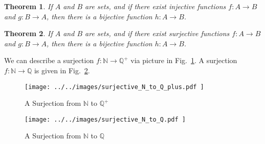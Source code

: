\documentclass{article}
\theoremstyle{plain}
\newtheorem{theorem}{Theorem}[section]
\theoremstyle{normal}
\begin{document}
        \begin{theorem}
            If $A$ and $B$ are sets, and if there exist injective functions
            $f:A\rightarrow{B}$ and $g:B\rightarrow{A}$, then there is a
            bijective function $h:A\rightarrow{B}$.
        \end{theorem}
        \begin{theorem}
            If $A$ and $B$ are sets, and if there exist surjective functions
            $f:A\rightarrow{B}$ and $g:B\rightarrow{A}$, then there is a
            bijective function $h:A\rightarrow{B}$.
        \end{theorem}
        We can describe a surjection $f:\mathbb{N}\rightarrow\mathbb{Q}^{+}$
        via picture in Fig.~\ref{fig:surjective_N_to_Q_plus}. A surjection
        $f:\mathbb{N}\rightarrow\mathbb{Q}$ is given in
        Fig.~\ref{fig:surjective_N_to_Q}.
        \begin{figure}
            \centering
            \texttt{[image: ../../images/surjective\_N\_to\_Q\_plus.pdf ]}
            \caption{A Surjection from $\mathbb{N}$ to $\mathbb{Q}^{+}$}
            \label{fig:surjective_N_to_Q_plus}
        \end{figure}
        \begin{figure}
            \centering
            \texttt{[image: ../../images/surjective\_N\_to\_Q.pdf ]}
            \caption{A Surjection from $\mathbb{N}$ to $\mathbb{Q}$}
            \label{fig:surjective_N_to_Q}
        \end{figure}
\end{document}
